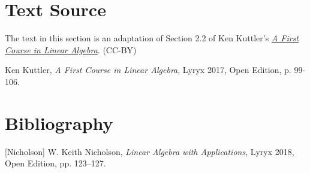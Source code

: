 \documentclass{ximera}
\begin{document}
\section*{Text Source}
The text in this section is an adaptation of Section 2.2 of Ken Kuttler's \href{https://open.umn.edu/opentextbooks/textbooks/a-first-course-in-linear-algebra-2017}{\it A First Course in Linear Algebra}. (CC-BY)

Ken Kuttler, {\it  A First Course in Linear Algebra}, Lyryx 2017, Open Edition, p. 99-106.

\section*{Bibliography}

[Nicholson] W. Keith Nicholson, {\it Linear Algebra with Applications}, Lyryx 2018, Open Edition, pp. 123--127.
\end{document}
